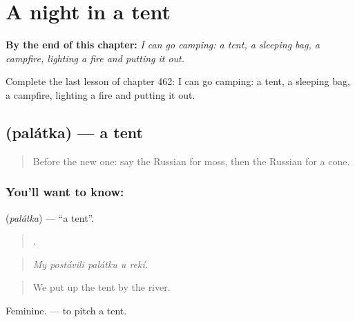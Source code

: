 
\chapter{A night in a tent}
\label{ch:ru-a-night-in-a-tent}

\begin{chapteropening}
\textbf{By the end of this chapter:} \emph{I can go camping: a tent, a sleeping bag, a campfire, lighting a fire and putting it out.}

Complete the last lesson of chapter 462: I can go camping: a tent, a sleeping bag, a campfire, lighting a fire and putting it out.
\end{chapteropening}

\section[\texorpdfstring{\ru{палатка} (palátka)}{палатка (palátka)}]{ (palátka) — a tent}

\label{lesson:RU-C462-palatka}



\begin{quote}
Before the new one: say the Russian for moss, then the Russian for a cone.
\end{quote}

\subsection*{You'll want to know: }
\textbf{} (\emph{palátka}) — \textquotedblleft{}a tent\textquotedblright{}.

\begin{quote}
    .
\end{quote}

\begin{quote}
\emph{My postávili palátku u rekí.}
\end{quote}

\begin{quote}
We put up the tent by the river.
\end{quote}

Feminine. \emph{ } — to pitch a tent.

